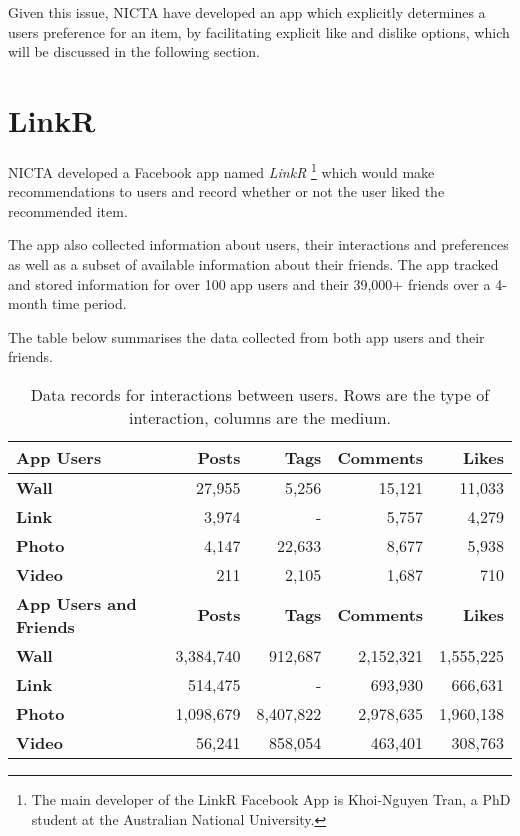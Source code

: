 Given this issue, NICTA have developed an app which explicitly determines a users preference for an item, by facilitating explicit 
like and dislike options, which will be discussed in the following section.


\section{LinkR}
\label{sec:linkr}

NICTA developed a Facebook app named \emph{LinkR} \footnote{The main developer of the LinkR Facebook App is Khoi-Nguyen Tran, 
a PhD student at the Australian National University.} which would make recommendations to users and record whether or not the 
user liked the recommended item.

The app also collected information about users, their interactions and preferences as well as a subset of available information about 
their friends. The app tracked and stored information for over 100 app users and their 39,000+ friends over a 4-month time period.

The table below summarises the data collected from both app users and their friends.

\begin{table}[!htbp]
\centering
	\begin{tabular}{|l|r|r|r|r|} %
		\hline
		\textbf{App Users} & \textbf{Posts} & \textbf{Tags} & \textbf{Comments} & \textbf{Likes}  \\ \hline
		\textbf{Wall} & 27,955 & 5,256 & 15,121 & 11,033 \\ \hline
		\textbf{Link} & 3,974 & - & 5,757 & 4,279 \\ \hline
		\textbf{Photo} & 4,147 & 22,633 & 8,677 & 5,938 \\ \hline
		\textbf{Video} & 211 & 2,105 & 1,687 & 710 \\ \hline
		 \hline
		\textbf{App Users and Friends} & \textbf{Posts} & \textbf{Tags} & \textbf{Comments} & \textbf{Likes}  \\ \hline
		\textbf{Wall} & 3,384,740 & 912,687 & 2,152,321 & 1,555,225 \\ \hline
		\textbf{Link} & 514,475 & - & 693,930 & 666,631 \\ \hline
		\textbf{Photo} & 1,098,679 & 8,407,822 & 2,978,635 & 1,960,138 \\ \hline
		\textbf{Video} & 56,241 & 858,054 & 463,401 & 308,763 \\ \hline
	\end{tabular}
	\caption{Data records for interactions between users. Rows are the type of interaction, columns are the medium.}
	\label{tab:revpol}
\end{table}


